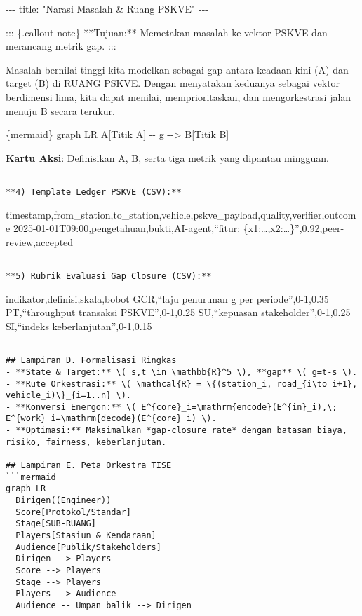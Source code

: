 \documentclass[
  letterpaper,
  DIV=11,
  numbers=noendperiod]{scrartcl}
\newenvironment{Shaded}{\begin{snugshade}}{\end{snugshade}}
\newcommand{\AnnotationTok}[1]{\textcolor[rgb]{0.37,0.37,0.37}{#1}}
\newcommand{\CommentTok}[1]{\textcolor[rgb]{0.37,0.37,0.37}{#1}}
\newcommand{\InformationTok}[1]{\textcolor[rgb]{0.37,0.37,0.37}{#1}}
\newcommand{\NormalTok}[1]{\textcolor[rgb]{0.00,0.23,0.31}{#1}}
\begin{document}
\begin{Shaded}
\begin{Highlighting}[]
\CommentTok{{-}{-}{-}}
\AnnotationTok{title:}\CommentTok{ "Narasi Masalah \& Ruang PSKVE"}
\CommentTok{{-}{-}{-}}

\NormalTok{::: \{.callout{-}note\}}
\NormalTok{**Tujuan:** Memetakan masalah ke vektor PSKVE dan merancang metrik gap.}
\NormalTok{:::}

\NormalTok{Masalah bernilai tinggi kita modelkan sebagai gap antara keadaan kini (A) dan target (B) di RUANG PSKVE. Dengan menyatakan keduanya sebagai vektor berdimensi lima, kita dapat menilai, memprioritaskan, dan mengorkestrasi jalan menuju B secara terukur.}

\InformationTok{\textasciigrave{}\textasciigrave{}\textasciigrave{}\{mermaid\}}
\NormalTok{graph LR}
\NormalTok{  A[Titik A] {-}{-} g {-}{-}\textgreater{} B[Titik B]}
\end{Highlighting}
\end{Shaded}

\textbf{Kartu Aksi}: Definisikan A, B, serta tiga metrik yang dipantau
mingguan.

\begin{verbatim}

**4) Template Ledger PSKVE (CSV):**
\end{verbatim}

timestamp,from\_station,to\_station,vehicle,pskve\_payload,quality,verifier,outcome
2025-01-01T09:00,pengetahuan,bukti,AI-agent,``fitur:
\{x1:\ldots,x2:\ldots\}'',0.92,peer-review,accepted

\begin{verbatim}

**5) Rubrik Evaluasi Gap Closure (CSV):**
\end{verbatim}

indikator,definisi,skala,bobot GCR,``laju penurunan
\textbar\textbar g\textbar\textbar{} per periode'',0-1,0.35
PT,``throughput transaksi PSKVE'',0-1,0.25 SU,``kepuasan
stakeholder'',0-1,0.25 SI,``indeks keberlanjutan'',0-1,0.15

\begin{verbatim}

## Lampiran D. Formalisasi Ringkas
- **State & Target:** \( s,t \in \mathbb{R}^5 \), **gap** \( g=t-s \).
- **Rute Orkestrasi:** \( \mathcal{R} = \{(station_i, road_{i\to i+1}, vehicle_i)\}_{i=1..n} \).
- **Konversi Energon:** \( E^{core}_i=\mathrm{encode}(E^{in}_i),\; E^{work}_i=\mathrm{decode}(E^{core}_i) \).
- **Optimasi:** Maksimalkan *gap‑closure rate* dengan batasan biaya, risiko, fairness, keberlanjutan.

## Lampiran E. Peta Orkestra TISE
```mermaid
graph LR
  Dirigen((Engineer))
  Score[Protokol/Standar]
  Stage[SUB-RUANG]
  Players[Stasiun & Kendaraan]
  Audience[Publik/Stakeholders]
  Dirigen --> Players
  Score --> Players
  Stage --> Players
  Players --> Audience
  Audience -- Umpan balik --> Dirigen
\end{verbatim}
\end{document}
